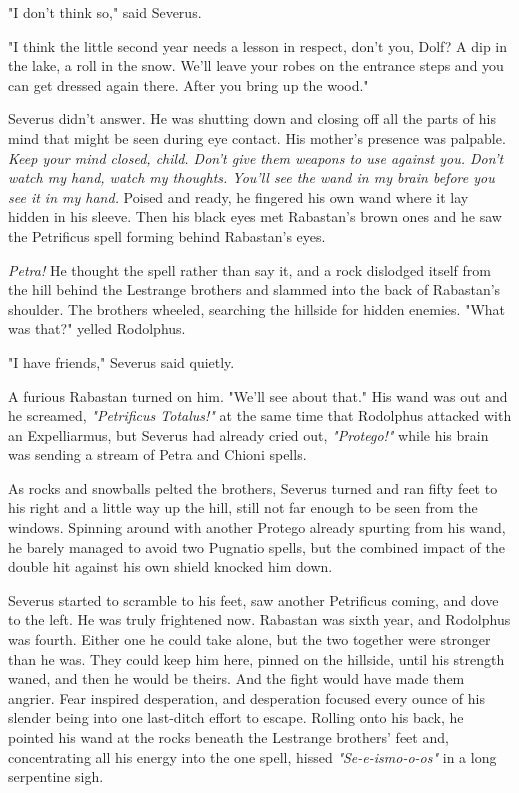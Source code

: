 "I don't think so," said Severus.

"I think the little second year needs a lesson in respect, don't you, Dolf? A dip in the lake, a roll in the snow. We'll leave your robes on the entrance steps and you can get dressed again there. After you bring up the wood."

Severus didn't answer. He was shutting down and closing off all the parts of his mind that might be seen during eye contact. His mother's presence was palpable. \emph{Keep your mind closed, child. Don't give them weapons to use against you. Don't watch my hand, watch my thoughts. You'll see the wand in my brain before you see it in my hand.} Poised and ready, he fingered his own wand where it lay hidden in his sleeve. Then his black eyes met Rabastan's brown ones and he saw the Petrificus spell forming behind Rabastan's eyes.

\emph{Petra!} He thought the spell rather than say it, and a rock dislodged itself from the hill behind the Lestrange brothers and slammed into the back of Rabastan's shoulder. The brothers wheeled, searching the hillside for hidden enemies. "What was that?" yelled Rodolphus.

"I have friends," Severus said quietly.

A furious Rabastan turned on him. "We'll see about that." His wand was out and he screamed, \emph{"Petrificus Totalus!"} at the same time that Rodolphus attacked with an Expelliarmus, but Severus had already cried out, \emph{"Protego!"} while his brain was sending a stream of Petra and Chioni spells.

As rocks and snowballs pelted the brothers, Severus turned and ran fifty feet to his right and a little way up the hill, still not far enough to be seen from the windows. Spinning around with another Protego already spurting from his wand, he barely managed to avoid two Pugnatio spells, but the combined impact of the double hit against his own shield knocked him down.

Severus started to scramble to his feet, saw another Petrificus coming, and dove to the left. He was truly frightened now. Rabastan was sixth year, and Rodolphus was fourth. Either one he could take alone, but the two together were stronger than he was. They could keep him here, pinned on the hillside, until his strength waned, and then he would be theirs. And the fight would have made them angrier. Fear inspired desperation, and desperation focused every ounce of his slender being into one last-ditch effort to escape. Rolling onto his back, he pointed his wand at the rocks beneath the Lestrange brothers' feet and, concentrating all his energy into the one spell, hissed \emph{"Se-e-ismo-o-os"} in a long serpentine sigh.


